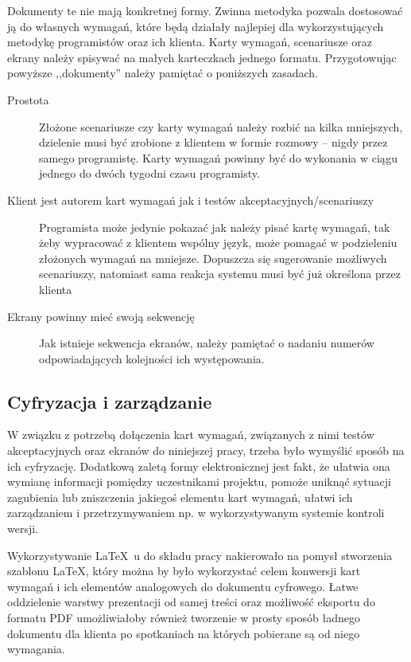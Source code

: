 Dokumenty te nie mają konkretnej formy. Zwinna metodyka pozwala dostosować ją do własnych wymagań, które będą działały najlepiej dla wykorzystujących metodykę programistów oraz ich klienta. Karty wymagań, scenariusze oraz ekrany należy spisywać na małych karteczkach jednego formatu. Przygotowując powyższe ,,dokumenty'' należy pamiętać o poniższych zasadach.

\begin{description}
    \item[Prostota]Złożone scenariusze czy karty wymagań należy rozbić na kilka mniejszych, dzielenie musi być zrobione z klientem w formie rozmowy -- nigdy przez samego programistę. Karty wymagań powinny być do wykonania w ciągu jednego do dwóch tygodni czasu programisty.
    \item[Klient jest autorem kart wymagań jak i testów akceptacyjnych/scenariuszy]Programista może jedynie pokazać jak należy pisać kartę wymagań, tak żeby wypracować z klientem wspólny język, może pomagać w podzieleniu złożonych wymagań na mniejsze. Dopuszcza się sugerowanie możliwych scenariuszy, natomiast sama reakcja systemu musi być już określona przez klienta
    \item[Ekrany powinny mieć swoją sekwencję]Jak istnieje sekwencja ekranów, należy pamiętać o nadaniu numerów odpowiadających kolejności ich występowania.
\end{description}

\subsection{Cyfryzacja i zarządzanie}
\label{sec:ZSWcyfryzacja}

W związku z potrzebą dołączenia kart wymagań, związanych z nimi testów akceptacyjnych oraz ekranów do niniejszej pracy, trzeba było wymyślić sposób na ich cyfryzację. Dodatkową zaletą formy elektronicznej jest fakt, że ułatwia ona wymianę informacji pomiędzy uczestnikami projektu, pomoże uniknąć sytuacji zagubienia lub zniszczenia jakiegoś elementu kart wymagań, ułatwi ich zarządzaniem i przetrzymywaniem np. w wykorzystywanym systemie kontroli wersji.

Wykorzystywanie \LaTeX~u do składu pracy nakierowało na pomysł stworzenia szablonu \LaTeX, który można by było wykorzystać celem konwersji kart wymagań i ich elementów analogowych do dokumentu cyfrowego. Łatwe oddzielenie warstwy prezentacji od samej treści oraz możliwość eksportu do formatu PDF umożliwiałoby również tworzenie w prosty sposób ładnego dokumentu dla klienta po spotkaniach na których pobierane są od niego wymagania.

